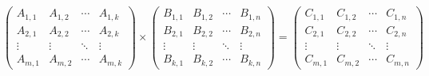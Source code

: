 \[
\begin{pmatrix}
  A_{1,1} & A_{1,2} & \cdots & A_{1,k} \\
  A_{2,1} & A_{2,2} & \cdots & A_{2,k} \\
  \vdots  & \vdots  & \ddots & \vdots  \\
  A_{m,1} & A_{m,2} & \cdots & A_{m,k} 
\end{pmatrix}
\times
\begin{pmatrix}
  B_{1,1} & B_{1,2} & \cdots & B_{1,n} \\
  B_{2,1} & B_{2,2} & \cdots & B_{2,n} \\
  \vdots  & \vdots  & \ddots & \vdots  \\
  B_{k,1} & B_{k,2} & \cdots & B_{k,n} 
\end{pmatrix}
=
\begin{pmatrix}
  C_{1,1} & C_{1,2} & \cdots & C_{1,n} \\
  C_{2,1} & C_{2,2} & \cdots & C_{2,n} \\
  \vdots  & \vdots  & \ddots & \vdots  \\
  C_{m,1} & C_{m,2} & \cdots & C_{m,n} 
\end{pmatrix}
\]
